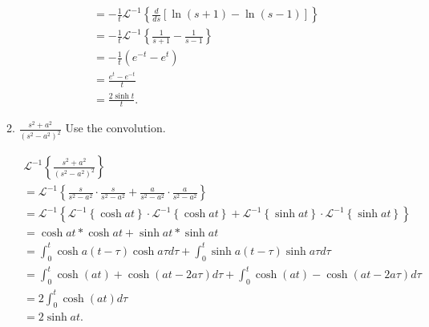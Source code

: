 \documentclass{zc-ust-hw}
\newcommand{\Li}[1]{\mathscr{L}^{-1}\left\{#1\right\}}
\begin{document}
\begin{enumerate}
\begin{enumerate}
\begin{sol}
\begin{align}
                      &= -\frac{1}{t}\Li{\frac{d}{ds}\left[ \ln (s+1)-\ln (s-1) \right]} \\
                      &= -\frac{1}{t}\Li{\frac{1}{s+1}-\frac{1}{s-1}} \\
                      &= -\frac{1}{t}\left( e^{-t}-e^{t}   \right) \\
                      &= \frac{e^{t}-e^{-t}}{t} \\
                      &= \frac{2\sinh t}{t}
          .\end{align}
        \end{sol}
        \newpage
      \item $\frac{s^2+a^2}{\left(s^2-a^2\right)^2}$ Use the convolution.
        \begin{sol}
          \begin{gather}
            \Li{\frac{s^2+a^2}{\left(s^2-a^2\right)^2}} \\
            = \Li{\frac{s}{s^2-a^2}\cdot \frac{s}{s^2-a^2}+\frac{a}{s^2-a^2}\cdot \frac{a}{s^2-a^2}} \\
            = \Li{\Li{\cosh at}\cdot\Li{\cosh at}+\Li{\sinh at}\cdot\Li{\sinh at}} \\
            = \cosh at\ast\cosh at+\sinh at\ast\sinh at \\
          = \int_{0}^{t} \cosh a(t-\tau)\cosh a\tau d\tau + \int_{0}^{t} \sinh a(t-\tau)\sinh a\tau d\tau \\
          = \int_{0}^{t} \cosh(at)+\cosh(at-2a\tau) d\tau + \int_{0}^{t} \cosh(at)-\cosh(at-2a\tau) d\tau \\
          = 2\int_{0}^{t} \cosh(at) d\tau \\
          = 2\sinh at
          .\end{gather}
        \end{sol}
    \end{enumerate}


\end{enumerate}
\end{document}
